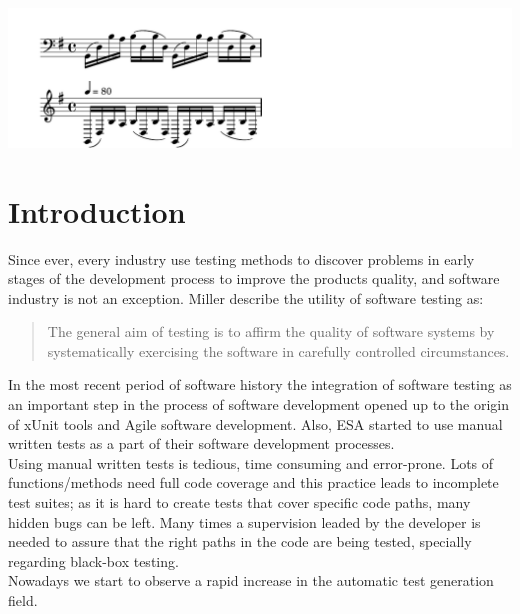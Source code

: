 \ifx\neat\undefined
\begin{savequote}[10pc]
{%
\parindent 0pt
\ifx\preLilyPondExample \undefined
\else
  \expandafter\preLilyPondExample
\fi
\def\lilypondbook{}%
\includegraphics[width=3.5\textwidth]{images/bachPrelude}
\ifx\postLilyPondExample \undefined
\else
  \expandafter\postLilyPondExample
\fi
}
\end{savequote}
\fi
\chapter{Introduction}
\minitoc

Since ever, every industry use testing methods to discover problems in early stages of the development process to improve
the products quality, and software industry is not an exception. Miller\cite{miller} describe the utility
of software testing as:

\begin{quotation}
The general aim of testing is to affirm the quality of software systems by systematically
exercising the software in carefully controlled circumstances.
\end{quotation}

In the most recent period of software history the integration of
software testing as an important step in the process of
software development opened up to the origin of xUnit\cite{xunit}
tools and Agile software development.
Also, \ac{ESA} started to use manual written tests as a part of their
software development processes.\\
Using  manual written tests is tedious, time consuming and error-prone.
Lots of functions/methods need full code coverage and this practice
leads to incomplete test suites;
as it is hard to create tests that cover specific code paths, many
hidden bugs can be left.
Many times a supervision leaded by the developer
is needed to assure that the right paths in the code are being tested,
specially regarding black-box testing.\\
Nowadays we start to observe a rapid increase in the automatic test
generation field.

